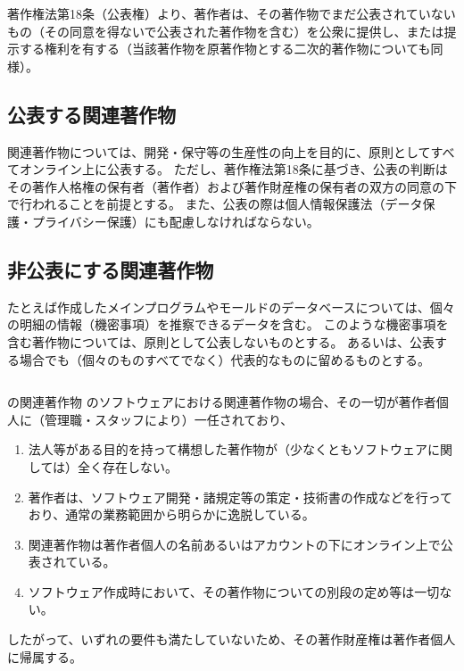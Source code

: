 著作権法第18条（公表権）より、著作者は、その著作物でまだ公表されていないもの（その同意を得ないで公表された著作物を含む）を公衆に提供し、または提示する権利を有する（当該著作物を原著作物とする二次的著作物についても同様）。


\subsection{公表する関連著作物}
関連著作物については、開発・保守等の生産性の向上を目的に、原則としてすべてオンライン上に公表する。
ただし、著作権法第18条に基づき、公表の判断はその著作人格権の保有者（著作者）および著作財産権の保有者の双方の同意の下で行われることを前提とする。
また、公表の際は個人情報保護法（データ保護・プライバシー保護）にも配慮しなければならない。


\subsection{非公表にする関連著作物}
たとえば作成したメインプログラムやモールドのデータベースについては、個々の明細の情報（機密事項）を推察できるデータを含む。
このような機密事項を含む著作物については、原則として公表しないものとする。
あるいは、公表する場合でも（個々のものすべてでなく）代表的なものに留めるものとする。



\clearpage
\begin{Column}{\DMname の関連著作物}
\DMname のソフトウェアにおける関連著作物の場合、その一切が著作者個人に（管理職・スタッフにより）一任されており、
\begin{enumerate}[label=\Roman*]
\item 法人等がある目的を持って構想した著作物が（少なくともソフトウェアに関しては）全く存在しない。
\item 著作者は、ソフトウェア開発・諸規定等の策定・技術書の作成などを行っており、通常の業務範囲から明らかに逸脱している。
\item 関連著作物は著作者個人の名前あるいはアカウントの下にオンライン上で公表されている。
\item ソフトウェア作成時において、その著作物についての別段の定め等は一切ない。
\end{enumerate}
したがって、いずれの要件も満たしていないため、その著作財産権は著作者個人に帰属する。
\end{Column}




